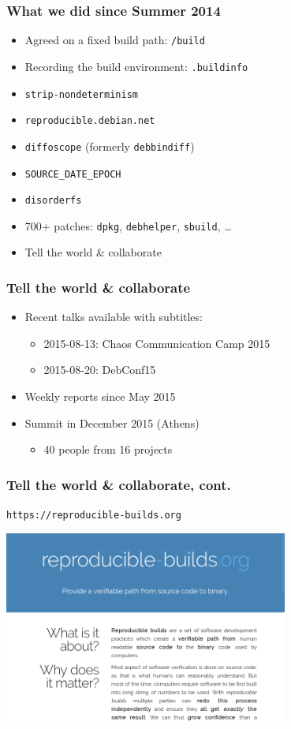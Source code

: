 \documentclass[14pt]{beamer}
\begin{document}
\begin{frame}
 \frametitle{What we did since Summer 2014}

 \begin{itemize}
  \item Agreed on a fixed build path: \texttt{/build}
  \item Recording the build environment: \texttt{.buildinfo}
  \item \texttt{strip-nondeterminism}
  \item \texttt{reproducible.debian.net}
  \item \texttt{diffoscope} (formerly \texttt{debbindiff})
  \item \texttt{SOURCE\_DATE\_EPOCH}
  \item \texttt{disorderfs}
  \item 700+ patches: \texttt{dpkg}, \texttt{debhelper}, \texttt{sbuild}, …
  \item<2> Tell the world \& collaborate
 \end{itemize}
\end{frame}

\begin{frame}
 \frametitle{Tell the world \& collaborate}

 \begin{itemize}
  \item Recent talks available with subtitles:
   \begin{itemize}
    \item 2015-08-13: Chaos Communication Camp 2015
    \item 2015-08-20: DebConf15
   \end{itemize}
  \item Weekly reports since May 2015
  \item Summit in December 2015 (Athens)
   \begin{itemize}
    \item 40 people from 16 projects
   \end{itemize}
 \end{itemize}
\end{frame}

\begin{frame}
 \frametitle{Tell the world \& collaborate, cont.}

 \begin{center}
 \texttt{https://reproducible-builds.org}

 \includegraphics[width=0.7\textwidth]{images/rbwww1.png}
 \end{center}
\end{frame}
\end{document}
